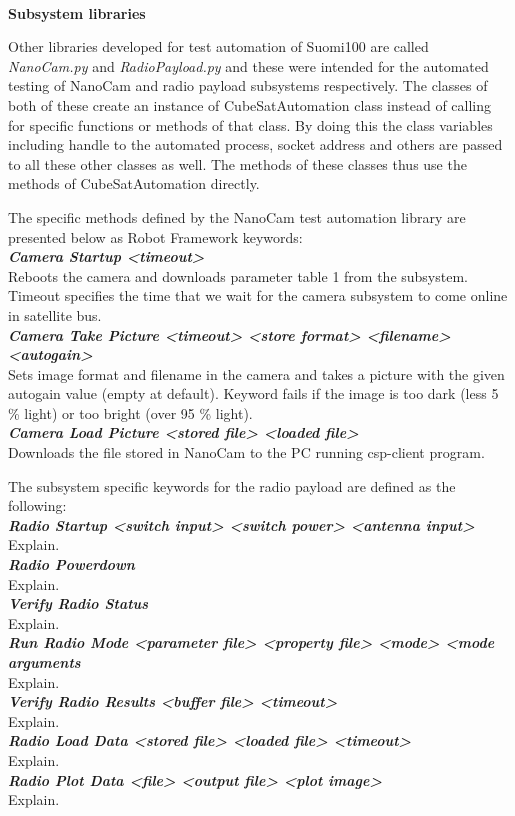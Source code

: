 \documentclass[english,12pt,a4paper,pdftex,elec,utf8]{aaltothesis}
\begin{document}
\\
\textbf{Subsystem libraries}\par 
Other libraries developed for test automation of Suomi100 are called \textit{NanoCam.py} and \textit{RadioPayload.py} and these were intended for the automated testing of NanoCam and radio payload subsystems respectively. The classes of both of these create an instance of CubeSatAutomation class instead of calling for specific functions or methods of that class. By doing this the class variables including handle to the automated process, socket address and others are passed to all these other classes as well. The methods of these classes thus use the methods of CubeSatAutomation directly.\par
The specific methods defined by the NanoCam test automation library are presented below as Robot Framework keywords:\\
\textit{\textbf{Camera Startup	<timeout>}}\\
Reboots the camera and downloads parameter table 1 from the subsystem. Timeout specifies the time that we wait for the camera subsystem to come online in satellite bus.\\
\textit{\textbf{Camera Take Picture	<timeout> <store format> <filename> <autogain>}}\\
Sets image format and filename in the camera and takes a picture with the given autogain value (empty at default). Keyword fails if the image is too dark (less 5 \% light) or too bright (over 95 \% light).\\
\textit{\textbf{Camera Load Picture	<stored file> <loaded file>}}\\
Downloads the file stored in NanoCam to the PC running csp-client program.\\
\par
The subsystem specific keywords for the radio payload are defined as the following:\\
\textit{\textbf{Radio Startup  <switch input> <switch power> <antenna input>}}\\
Explain.\\
\textit{\textbf{Radio Powerdown}}\\
Explain.\\
\textit{\textbf{Verify Radio Status}}\\
Explain.\\
\textit{\textbf{Run Radio Mode  <parameter file> <property file> <mode> <mode arguments}}\\
Explain.\\
\textit{\textbf{Verify Radio Results  <buffer file> <timeout>}}\\
Explain.\\
\textit{\textbf{Radio Load Data  <stored file> <loaded file> <timeout>}}\\
Explain.\\
\textit{\textbf{Radio Plot Data  <file> <output file> <plot image>}}\\
Explain.\\
  
\end{document}
